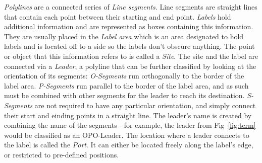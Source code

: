 \documentclass[11pt,a4paper]{vutinfth}
\begin{document}
\emph{Polylines} are a connected series of \emph{Line segments}. Line segments are straight lines that contain each point between their starting and end point. %
\emph{Labels} hold additional information and are represented as boxes containing this information. They are usually placed in the \emph{Label area} which is an area designated to hold labels and is located off to a side so the labels don't obscure anything.
The point or object that this information refers to is called a \emph{Site}. The site and the label are connected via a \emph{Leader}, a polyline that can be further classified by looking at the orientation of its segments: \emph{O-Segments} run orthogonally to the border of the label area. \emph{P-Segments} run parallel to the border of the label area, and as such must be combined with other segments for the leader to reach its destination. \emph{S-Segments} are not required to have any particular orientation, and simply connect their start and einding points in a straight line.
The leader's name is created by combining the name of the segments - for example, the leader from Fig~\ref{fig:term} would be classified as an OPO-Leader.
The location where a leader connects to the label is called the \emph{Port}. It can either be located freely along the label's edge, or restricted to pre-defined positions.
\end{document}
